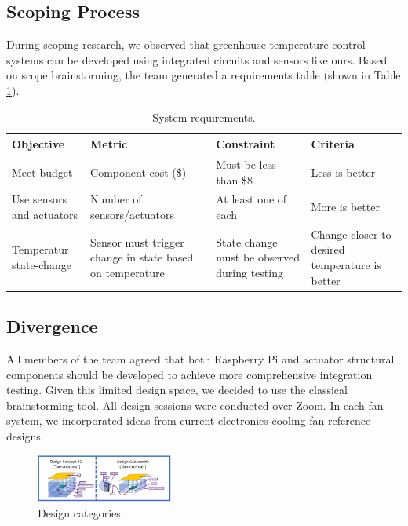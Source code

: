 \documentclass[11pt]{article}
\begin{document}
\subsection{Scoping Process}
During scoping research, we observed that greenhouse temperature control systems can be developed using integrated circuits and sensors like ours. Based on scope brainstorming, the team generated a requirements table (shown in Table \ref{systemRequirements}).
\begin{table}[h]
\begin{center}
\caption{System requirements.}
\label{systemRequirements}
    \begin{tabular}{ |p{3cm}|p{5cm}|p{4cm}|p{3cm}| } 
     \hline\hline
     \textbf{Objective} & \textbf{Metric} & \textbf{Constraint} & \textbf{Criteria} \\ 
     \hline\hline
     Meet budget & Component cost (\$) & Must be less than \$8 & Less is better \\ 
     \hline
     Use sensors and actuators & Number of sensors/actuators & At least one of each & More is better \\
     \hline
     Temperatur state-change & Sensor must trigger change in state based on temperature & State change must be observed during testing & Change closer to desired temperature is better \\
     \hline\hline
    \end{tabular}
\end{center}
\end{table}
\subsection{Divergence}
All members of the team agreed that both Raspberry Pi and actuator structural components should be developed to achieve more comprehensive integration testing. Given this limited design space, we decided to use the classical brainstorming tool. All design sessions were conducted over Zoom. In each fan system, we incorporated ideas from current electronics cooling fan reference designs.
\begin{figure}
    \centering
    \includegraphics[width=0.4\textwidth]{designCategories}
  \caption{Design categories.}
  \label{designCategories}
\end{figure}
\end{document}
